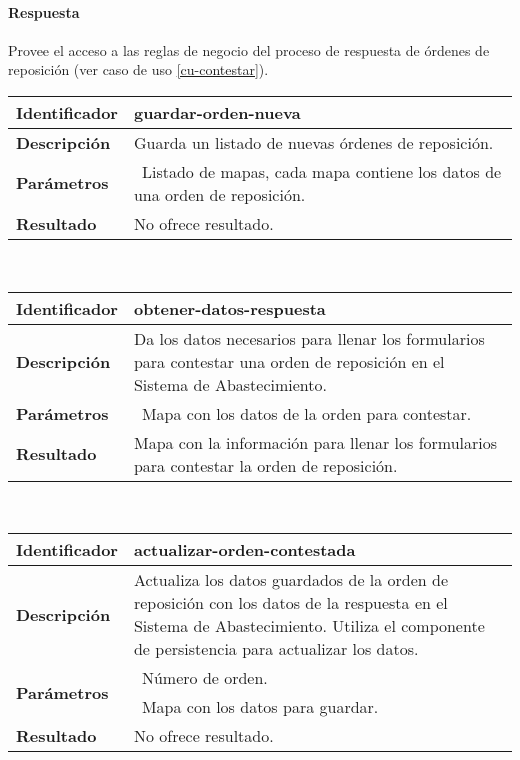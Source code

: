 \paragraph{Respuesta\\}
Provee el acceso a las reglas de negocio del proceso de respuesta de órdenes de reposición (ver caso de uso \ref{cu-contestar}).
	\vspace{5mm}\\
	\begin{tabular}{|p{}|p{}|}
		\hline
		\textbf{Identificador}	& \textbf{guardar-orden-nueva}\\
		\hline
		\hline
		\textbf{Descripción}	& Guarda un listado de nuevas órdenes de reposición.\\
		\hline
		\textbf{Parámetros}		& \textbullet\, Listado de mapas, cada mapa contiene los datos de una orden de reposición.\\
		\hline
		\textbf{Resultado}		& No ofrece resultado.\\
		\hline
	\end{tabular}
	\vspace{5mm}\\
	\begin{tabular}{|p{}|p{}|}
		\hline
		\textbf{Identificador}	& \textbf{obtener-datos-respuesta}\\
		\hline
		\hline
		\textbf{Descripción}	& Da los datos necesarios para llenar los formularios para contestar una orden de reposición en el Sistema de Abastecimiento.\\
		\hline
		\textbf{Parámetros}		& \textbullet\, Mapa con los datos de la orden para contestar.\\
		\hline
		\textbf{Resultado}		& Mapa con la información para llenar los formularios para contestar la orden de reposición.\\
		\hline
	\end{tabular}
	\vspace{5mm}\\
	\begin{tabular}{|p{}|p{}|}
		\hline
		\textbf{Identificador}	& \textbf{actualizar-orden-contestada}\\
		\hline
		\hline
		\textbf{Descripción}	& Actualiza los datos guardados de la orden de reposición con los datos de la respuesta en el  Sistema de Abastecimiento. Utiliza el componente de persistencia para actualizar los datos.\\
		\hline
		\multirow{2}{*}{\textbf{Parámetros}}	& \textbullet\, Número de orden.\\
												& \textbullet\, Mapa con los datos para guardar.\\
		\hline
		\textbf{Resultado}		& No ofrece resultado.\\
		\hline
	\end{tabular}
